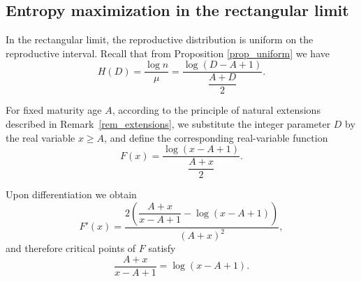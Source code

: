 \documentclass[10pt,a4paper]{amsart}
\theoremstyle{definition}
\theoremstyle{remark}
\numberwithin{equation}{section}
\def\R{{\mathbb R}}
\begin{document}
%
%
%
%
%
%
%
%
%
%


\subsection{Entropy maximization in the rectangular limit}

In the rectangular limit, the reproductive
distribution is uniform on the reproductive interval.
Recall that from Proposition \ref{prop_uniform}
we have
\[
H(D)
= \frac{\log n}{\mu} =
\frac{\log(D-A+1)}{\dfrac{A+D}{2}} .
\]

For fixed maturity age \(A\), according to the principle of natural
extensions described in Remark~\ref{rem_extensions}, we substitute the integer parameter $D$ by the real variable \(x\geq A\), and define the corresponding
real-variable function
\begin{equation}
\label{eq_F_function}
F(x)
=
\frac{\log(x-A+1)}{\dfrac{A+x}{2}} .
\end{equation}

Upon differentiation we obtain
\[
F'(x)
=
\frac{
2\left( 
\dfrac{A+x}{x-A+1}
-
\log(x-A+1)
\right)
}{
(A+x)^2
},
\]
and therefore critical points of \(F\) satisfy
\begin{equation}
\label{eq_critical}
\frac{A+x}{x-A+1}
=
\log(x-A+1).
\end{equation}
\end{document}
